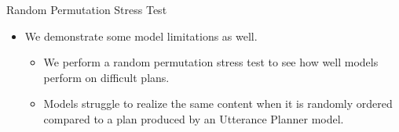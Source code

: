 \begin{frame}{Random Permutation Stress Test}
\begin{itemize} 
\item We demonstrate some model limitations as well.
\begin{itemize}
\item We perform a random permutation stress test to see how well models perform on difficult plans.
    \item Models struggle to realize the same content when it is randomly ordered compared to a plan produced by an Utterance Planner model.
\end{itemize}
\end{itemize}


\end{frame}

